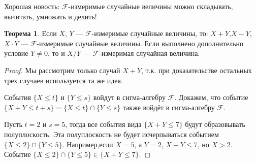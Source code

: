 \documentclass[pdftex, 12pt, a4paper]{article}
\def\F{\ensuremath{\mathcal{F}}} %
\renewcommand{\le}{\leqslant}
\theoremstyle{definition} %
\newtheorem{myth}{Теорема}
\numberwithin{problem}{section}
\numberwithin{blits}{section}
\begin{document}
Хорошая новость: \F-измеримые случайные величины можно складывать, вычитать, умножать и делить!

\begin{myth}\label{th:sum} Если $X$, $Y$ --- \F-измеримые случайные величины, то: $X+Y$,$X-Y$, $X\cdot Y$ --- \F-измеримые случайные величины. Если выполнено дополнительно условие $Y \neq 0$, то и $X/Y$ --- \F-измеримая случайная величина.
\end{myth}


\begin{proof} Мы рассмотрим только случай $X+Y$, т.к. при доказательстве остальных трех случаев используется та же идея.

События $\{X \le t \}$ и $\{Y \le s\}$ войдут в сигма-алгебру $\F$. Докажем, что событие $\{X+Y \le t+s\} = \{X \le t \} \cap \{Y \le s \} $ также войдёт в сигма-алгебру $\F$. 

Пусть $t=2$ и $s=5$, тогда все события вида $\{X+Y \le 7\} $ будут образовывать полуплоскость. Эта полуплоскость не будет исчерпываться событием $\{X \le 2 \} \cap \{Y \le 5 \}$. Например,если $X=5$, а $Y = 2$, $X+Y \le 7$, но $X>2$. Событие  $\{X \le 2 \} \cap \{Y \le 5 \} \in \{X+Y \le 7\}$.


\end{proof}
\end{document}
